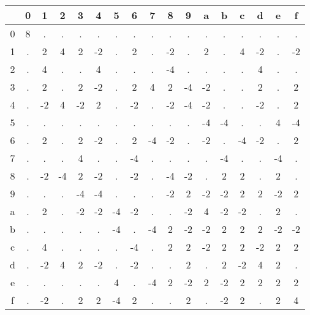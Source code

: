     \begin{tabular}{|c|cccccccccccccccc|}
        \hline
          & 0 & 1 & 2 & 3 & 4 & 5 & 6 & 7 & 8 & 9 & a & b & c & d & e & f \\
        \hline
        0 & 8 & . & . & . & . & . & . & . & . & . & . & . & . & . & . & . \\
        1 & . & 2 & 4 & 2 & -2 & . & 2 & . & -2 & . & 2 & . & 4 & -2 & . & -2 \\
        2 & . & 4 & . & . & 4 & . & . & . & -4 & . & . & . & . & 4 & . & . \\
        3 & . & 2 & . & 2 & -2 & . & 2 & 4 & 2 & -4 & -2 & . & . & 2 & . & 2 \\
        4 & . & -2 & 4 & -2 & 2 & . & -2 & . & -2 & -4 & -2 & . & . & -2 & . & 2 \\
        5 & . & . & . & . & . & . & . & . & . & . & -4 & -4 & . & . & 4 & -4 \\
        6 & . & 2 & . & 2 & -2 & . & 2 & -4 & -2 & . & -2 & . & -4 & -2 & . & 2 \\
        7 & . & . & . & 4 & . & . & -4 & . & . & . & . & -4 & . & . & -4 & . \\
        8 & . & -2 & -4 & 2 & -2 & . & -2 & . & -4 & -2 & . & 2 & 2 & . & 2 & . \\
        9 & . & . & . & -4 & -4 & . & . & . & -2 & 2 & -2 & -2 & 2 & 2 & -2 & 2 \\
        a & . & 2 & . & -2 & -2 & -4 & -2 & . & . & -2 & 4 & -2 & -2 & . & 2 & . \\
        b & . & . & . & . & . & -4 & . & -4 & 2 & -2 & -2 & 2 & 2 & 2 & -2 & -2 \\
        c & . & 4 & . & . & . & . & -4 & . & 2 & 2 & -2 & 2 & 2 & -2 & 2 & 2 \\
        d & . & -2 & 4 & 2 & -2 & . & -2 & . & . & 2 & . & 2 & -2 & 4 & 2 & . \\
        e & . & . & . & . & . & 4 & . & -4 & 2 & -2 & 2 & -2 & 2 & 2 & 2 & 2 \\
        f & . & -2 & . & 2 & 2 & -4 & 2 & . & . & 2 & . & -2 & 2 & . & 2 & 4 \\
        \hline
    \end{tabular}